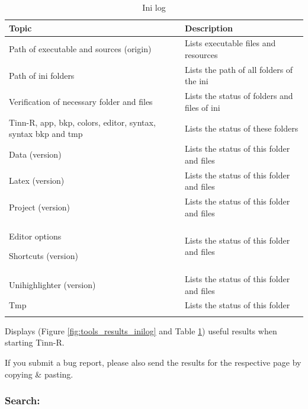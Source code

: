 \begin{table}
  \begin{footnotesize}
    \begin{tabularx}{\textwidth}{XX}\\
      \hline
      \textbf{Topic} & \textbf{Description} \\
      \hline
      Path of executable and sources (origin) & Lists executable files and resources \\
      Path of ini folders & Lists the path of all folders of the ini \\
      Verification of necessary folder and files & Lists the status of folders and files of ini \\
      Tinn-R, app, bkp, colors, editor, syntax, syntax bkp and tmp & Lists the status of these folders \\
      Data (version) & Lists the status of this folder and files \\
      Latex (version) & Lists the status of this folder and files \\
      Project (version) & Lists the status of this folder and files \\
      Editor options

      Shortcuts (version) & Lists the status of this folder and files \\
      Unihighlighter (version) & Lists the status of this folder and files \\
      Tmp & Lists the status of this folder \\
      \hline
      \\
    \end{tabularx}
  \end{footnotesize}
  \caption{Ini log}
  \label{tab:tools_results_inilog}
\end{table}


Displays
(Figure \ref{fig:tools_results_inilog} and
Table \ref{tab:tools_results_inilog})
useful results when starting Tinn-R.

If you submit a bug report, please also send the results for the
respective page by copying \& pasting.


\subsubsection{Search:}\\

